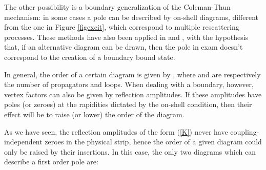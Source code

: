 \documentclass[a4paper,12pt]{report}
\begin{document}
The other possibility is a boundary generalization of the Coleman-Thun mechanism: in some cases a pole can be
described by on-shell diagrams, different from the one in Figure \ref{figexcit}, which correspond to multiple
rescattering processes. These methods have also been applied in \cite{delius} and \cite{dorey}, with the
hypothesis that, if an alternative diagram can be drawn, then the pole in exam doesn't correspond to the creation
of a boundary bound state.

In general, the order of a certain diagram is given by \coordHE{}, where \coordHE{} and \coordHE{} are respectively the number of
propagators and loops. When dealing with a boundary, however, vertex factors can also be given by reflection
amplitudes. If these amplitudes have poles (or zeroes) at the rapidities dictated by the on-shell condition, then
their effect will be to raise (or lower) the order of the diagram.

As we have seen, the reflection amplitudes of the form (\ref{K}) never have coupling-independent zeroes in the
physical strip, hence the order of a given diagram could only be raised by their insertions. In this case, the
only two diagrams which can describe a first order pole are:

\vspace{5cm}
\end{document}
